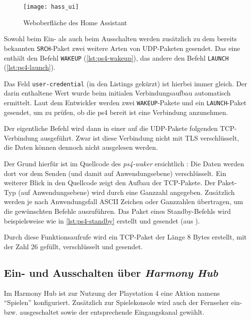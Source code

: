 \begin{figure}[h!]
    \centering
    \texttt{[image: hass\_ui]}
    \caption{Weboberfläche des Home Assistant}\label{fig:hass-ui}
\end{figure}

Sowohl beim Ein- als auch beim Ausschalten werden zusätzlich zu dem bereits bekannten \texttt{SRCH}-Paket
zwei weitere Arten von UDP-Paketen gesendet.
Das eine enthält den Befehl \texttt{WAKEUP} (\autoref{lst:ps4-wakeup}),
das andere den Befehl \texttt{LAUNCH} (\autoref{lst:ps4-launch}).




Das Feld \texttt{user-credential} (in den Listings gekürzt) ist hierbei immer gleich.
Der darin enthaltene Wert wurde beim initialen Verbindungsaufbau automatisch ermittelt.
Laut dem Entwickler werden zwei \texttt{WAKEUP}-Pakete und ein \texttt{LAUNCH}-Paket gesendet,
um zu prüfen, ob die \ac{ps4} bereit ist eine Verbindung anzunehmen.



Der eigentliche Befehl wird dann in einer auf die UDP-Pakete folgenden TCP-Verbindung ausgeführt.
Zwar ist diese Verbindung nicht mit TLS verschlüsselt,
die Daten können dennoch nicht ausgelesen werden.

Der Grund hierfür ist im Quellcode des \textit{ps4-waker} ersichtlich \cite{ps4waker31:online}\cite{ps4waker93:online}:
Die Daten werden dort vor dem Senden (und damit auf Anwendungsebene) verschlüsselt.
Ein weiterer Blick in den Quellcode zeigt den Aufbau der TCP-Pakete.
Der Paket-Typ (auf Anwendungsebene) wird durch eine Ganzzahl angegeben.
Zusätzlich werden je nach Anwendungsfall ASCII Zeichen oder Ganzzahlen übertragen,
um die gewünschten Befehle auszuführen.
Das Paket eines Standby-Befehls wird beispielsweise wie in \autoref{lst:ps4-standby} erstellt und gesendet (aus \cite{ps4waker31:online}).



Durch diese Funktionsaufrufe wird ein TCP-Paket der Länge 8 Bytes erstellt,
mit der Zahl 26 gefüllt,
verschlüsselt und gesendet.

\newpage

\subsection{Ein- und Ausschalten über \textit{Harmony Hub}}\label{sec:durchfuehrung-harmony}
Im Harmony Hub ist zur Nutzung der Playstation 4 eine Aktion namens \enquote{Spielen} konfiguriert.
Zusätzlich zur Spielekonsole wird auch der Fernseher ein- bzw. ausgeschaltet sowie der entsprechende Eingangskanal gewählt.

